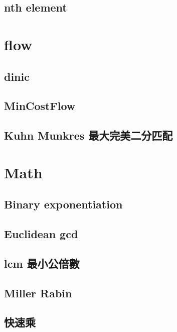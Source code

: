 \documentclass[a4paper,10pt,twocolumn,oneside]{article}
\begin{document}
\subsection{nth element}


\section{flow}

\subsection{dinic}


\subsection{MinCostFlow}


\subsection{Kuhn Munkres 最大完美二分匹配}


\section{Math}

\subsection{Binary exponentiation}


\subsection{Euclidean gcd}


\subsection{lcm 最小公倍數}


\subsection{Miller Rabin}


\subsection{快速乘}

\end{document}
